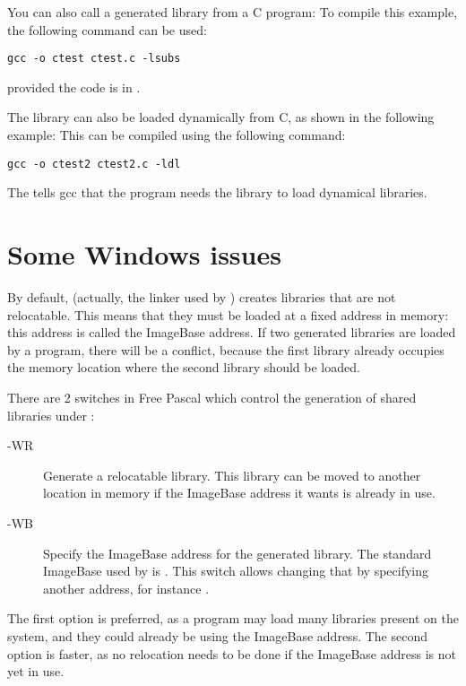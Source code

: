 You can also call a \fpc generated library from a C program:
To compile this example, the following command can be used:
\begin{verbatim}
gcc -o ctest ctest.c -lsubs
\end{verbatim}
provided the code is in .

The library can also be loaded dynamically from C, as shown in the following
example:
This can be compiled using the following command:
\begin{verbatim}
gcc -o ctest2 ctest2.c -ldl
\end{verbatim}

The  tells gcc that the program needs the  library
to load dynamical libraries.

\section{Some Windows issues}
\label{shlibwinissues}
By default, \fpc (actually, the linker used by \fpc)
creates libraries that are not relocatable. This means that they must be
loaded at a fixed address in memory: this address is called the
ImageBase address. If two \fpc generated libraries are loaded by a
program, there will be a conflict, because the first library already
occupies the memory location where the second library should be loaded.

There are 2 switches in Free Pascal which control the generation of
shared libraries under \windows:
\begin{description}
\item[-WR] Generate a relocatable library. This library can be moved to
another location in memory if the ImageBase address it wants is already
in use.
\item[-WB] Specify the ImageBase address for the generated library.
The standard ImageBase used by \fpc is . This switch
allows changing that by specifying another address, for instance
.
\end{description}
The first option is preferred, as a program may load many libraries
present on the system, and they could already be using the ImageBase
address. The second option is faster, as no relocation needs to be
done if the ImageBase address is not yet in use.


